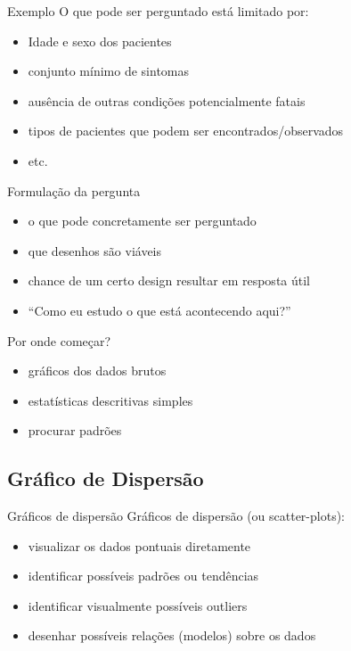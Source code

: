 \documentclass{beamer}
\begin{document}
\begin{frame}{Exemplo}
  O que \alert{pode} ser perguntado está limitado por:
  \begin{itemize}
  \item Idade e sexo dos pacientes
  \item conjunto mínimo de sintomas
  \item ausência de outras condições potencialmente fatais
  \item tipos de pacientes que podem ser encontrados/observados
  \item etc.
  \end{itemize}
\end{frame}

\begin{frame}{Formulação da pergunta}
  \begin{itemize}
  \item o que pode concretamente ser perguntado
  \item que desenhos são viáveis
  \item chance de um certo design resultar em resposta útil
  \item ``Como eu estudo o que está acontecendo aqui?''
  \end{itemize}
\end{frame}

\begin{frame}{Por onde começar?}
  \begin{itemize}
  \item gráficos dos dados brutos
  \item estatísticas descritivas simples
  \item procurar padrões
  \end{itemize}
\end{frame}

\subsection{Gráfico de Dispersão}

\begin{frame}{Gráficos de dispersão}
Gráficos de dispersão (ou scatter-plots):
  \begin{itemize}
  \item visualizar os dados pontuais diretamente
  \item identificar possíveis padrões ou tendências
  \item identificar visualmente possíveis outliers
  \item desenhar possíveis relações (modelos) sobre os dados
  \end{itemize}
\end{frame}
\end{document}
